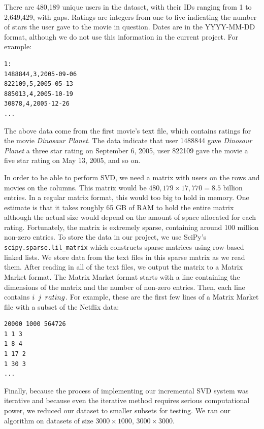 \documentclass{article} %
\begin{document}
There are 480,189 unique users in the dataset, with their IDs ranging from 1 to 2,649,429, with gaps.
Ratings are integers from one to five indicating the number of stars the user gave to the movie in question.
Dates are in the YYYY-MM-DD format, although we do not use this information in the current project.
For example:

\begin{verbatim}
1:
1488844,3,2005-09-06
822109,5,2005-05-13
885013,4,2005-10-19
30878,4,2005-12-26
...
\end{verbatim}

The above data come from the first movie's text file, which contains ratings for the movie \emph{Dinosaur Planet}. The data indicate that user 1488844 gave \emph{Dinosaur Planet} a three star rating on September 6, 2005, user 822109 gave the movie a five star rating on May 13, 2005, and so on.

In order to be able to perform SVD, we need a matrix with users on the rows and movies on the columns.
This matrix would be $480,179 \times 17,770 = 8.5 \textrm{ billion}$ entries.
In a regular matrix format, this would too big to hold in memory.
One estimate is that it takes roughly 65 GB of RAM to hold the entire matrix \citep{revoR} although the actual size would depend on the amount of space allocated for each rating.
Fortunately, the matrix is extremely sparse, containing around 100 million non-zero entries.
To store the data in our project, we use SciPy's \verb!scipy.sparse.lil_matrix! which constructs sparse matrices using row-based linked lists.
We store data from the text files in this sparse matrix as we read them.
After reading in all of the text files, we output the matrix to a Matrix Market format.
The Matrix Market format starts with a line containing the dimensions of the matrix and the number of non-zero entries.
Then, each line contains $i \enskip j \enskip rating$.
For example, these are the first few lines of a Matrix Market file with a subset of the Netflix data:

\begin{verbatim}
20000 1000 564726
1 1 3
1 8 4
1 17 2
1 30 3
...
\end{verbatim}

Finally, because the process of implementing our incremental SVD system was iterative and because even the iterative method requires serious computational power, we reduced our dataset to smaller subsets for testing.
We ran our algorithm on datasets of size $3000 \times 1000$, $3000 \times 3000$.
\end{document}
